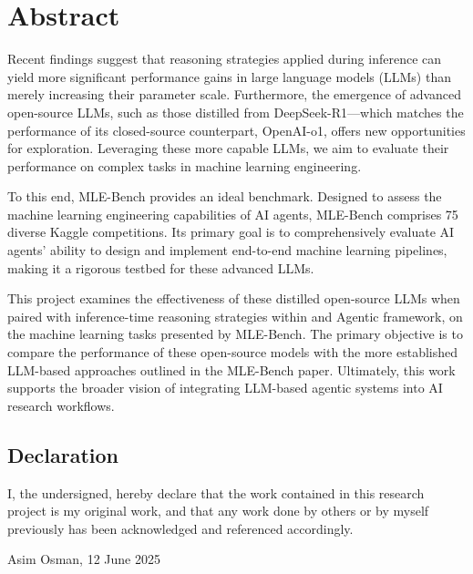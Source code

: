 \chapter*{Abstract}
Recent findings suggest that reasoning strategies applied during inference can yield more significant performance gains in large language models (LLMs) than merely increasing their parameter scale. Furthermore, the emergence of advanced open-source LLMs, such as those distilled from DeepSeek-R1—which matches the performance of its closed-source counterpart, OpenAI-o1, offers new opportunities for exploration. Leveraging these more capable LLMs, we aim to evaluate their performance on complex tasks in machine learning engineering.

To this end, MLE-Bench provides an ideal benchmark. Designed to assess the machine learning engineering capabilities of AI agents, MLE-Bench comprises 75 diverse Kaggle competitions. Its primary goal is to comprehensively evaluate AI agents' ability to design and implement end-to-end machine learning pipelines, making it a rigorous testbed for these advanced LLMs.

This project examines the effectiveness of these distilled open-source LLMs when paired with inference-time reasoning strategies within and Agentic framework, on the machine learning tasks presented by MLE-Bench. The primary objective is to compare the performance of these open-source models with the more established LLM-based approaches outlined in the MLE-Bench paper. Ultimately, this work supports the broader vision of integrating LLM-based agentic systems into AI research workflows.

\vfill

\section*{Declaration}

I, the undersigned, hereby declare that the work contained in this research project is my original work, and that any work done by others or by myself previously has been acknowledged and referenced accordingly.

Asim Osman, 12 June 2025